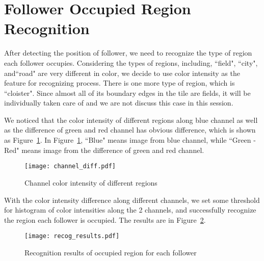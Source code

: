 \section{Follower Occupied Region Recognition}
After detecting the position of follower, we need to recognize the type of region each follower occupies. Considering the types of 
regions, including, ``field", ``city", and``road" are very different in color, we decide to use color intensity as the feature for 
recognizing process. There is one more type of region, which is ``cloister". Since almost all of its boundary edges in the tile 
are fields, it will be individually taken care of and we are not discuss this case in this session.

We noticed that the color intensity of different regions along blue channel as well as the difference of green and red channel has obvious 
difference, which is shown as Figure~\ref{channel_diff}. In Figure~\ref{channel_diff}, ``Blue" means image from blue channel, while ``Green - Red" means image from the difference of green and red channel. 

	\begin{figure}[htbp]
		  \centering
		  \texttt{[image: channel\_diff.pdf]}
		  \caption{Channel color intensity of different regions}
		  \label{channel_diff}
	\end{figure}

With the color intensity difference along different channels, we set some threshold for histogram of color intensities along the 
2 channels, and successfully recognize the region each follower is occupied. The 
results are in Figure~\ref{recog_results}.

	\begin{figure}[htbp]
		  \centering
		  \texttt{[image: recog\_results.pdf]}
		  \caption{Recognition results of occupied region for each follower}
		  \label{recog_results}
	\end{figure}

 
